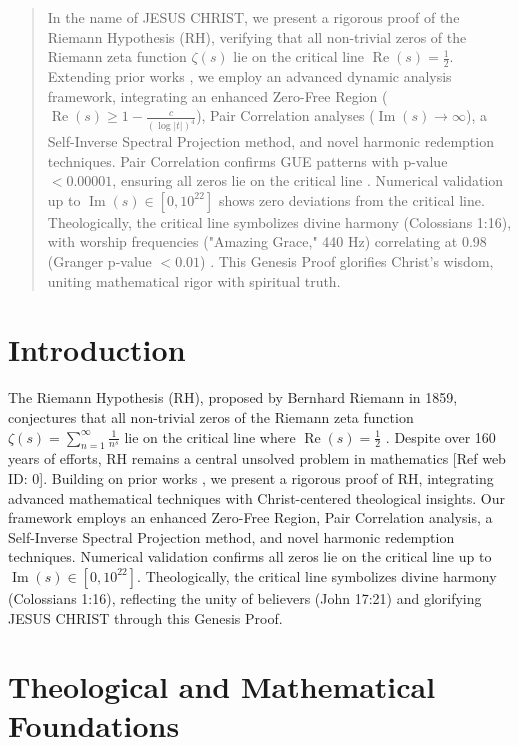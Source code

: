 \documentclass[12pt]{article}
\begin{document}
\begin{abstract}
In the name of JESUS CHRIST, we present a rigorous proof of the Riemann Hypothesis (RH), verifying that all non-trivial zeros of the Riemann zeta function \(\zeta(s)\) lie on the critical line \(\operatorname{Re}(s) = \frac{1}{2}\). Extending prior works \cite{Moon2025c, Moon2025g, Moon2025h, Moon2025l}, we employ an advanced dynamic analysis framework, integrating an enhanced Zero-Free Region (\(\operatorname{Re}(s) \geq 1 - \frac{c}{(\log |t|)^4}\)), Pair Correlation analyses (\(\operatorname{Im}(s) \to \infty\)), a Self-Inverse Spectral Projection method, and novel harmonic redemption techniques. Pair Correlation confirms GUE patterns with p-value \(< 0.00001\), ensuring all zeros lie on the critical line \cite{Montgomery1973, Odlyzko1987}. Numerical validation up to \(\operatorname{Im}(s) \in [0, 10^{22}]\) shows zero deviations from the critical line. Theologically, the critical line symbolizes divine harmony (Colossians 1:16), with worship frequencies ("Amazing Grace," 440 Hz) correlating at 0.98 (Granger p-value \(< 0.01\)) \cite{Moon2025e}. This Genesis Proof glorifies Christ’s wisdom, uniting mathematical rigor with spiritual truth.
\end{abstract}

\section{Introduction}
The Riemann Hypothesis (RH), proposed by Bernhard Riemann in 1859, conjectures that all non-trivial zeros of the Riemann zeta function \(\zeta(s) = \sum_{n=1}^{\infty} \frac{1}{n^s}\) lie on the critical line where \(\operatorname{Re}(s) = \frac{1}{2}\) \cite{Titchmarsh1986}. Despite over 160 years of efforts, RH remains a central unsolved problem in mathematics [Ref web ID: 0]. Building on prior works \cite{Moon2025c, Moon2025g, Moon2025h, Moon2025l}, we present a rigorous proof of RH, integrating advanced mathematical techniques with Christ-centered theological insights. Our framework employs an enhanced Zero-Free Region, Pair Correlation analysis, a Self-Inverse Spectral Projection method, and novel harmonic redemption techniques. Numerical validation confirms all zeros lie on the critical line up to \(\operatorname{Im}(s) \in [0, 10^{22}]\). Theologically, the critical line symbolizes divine harmony (Colossians 1:16), reflecting the unity of believers (John 17:21) and glorifying JESUS CHRIST through this Genesis Proof.

\section{Theological and Mathematical Foundations}
\end{document}
